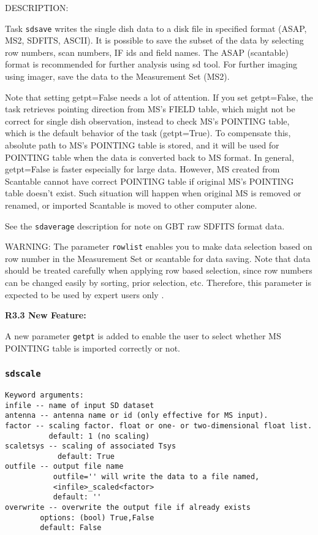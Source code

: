 DESCRIPTION:

Task {\tt sdsave} writes the single dish data to a disk file in 
specified format (ASAP, MS2, SDFITS, ASCII). It is possible to
save the subset of the data by selecting row numbers, scan numbers, IF ids
and field names. The ASAP (scantable) format is recommended for
further analysis using sd tool. For further imaging using imager,
save the data to the Measurement Set (MS2).
          
Note that setting getpt=False needs a lot of attention.
If you set getpt=False, the task retrieves pointing direction from 
MS's FIELD table, which might not be correct for single dish 
observation, instead to check MS's POINTING table, which is the 
default behavior of the task (getpt=True). To compensate this, 
absolute path to MS's POINTING table is stored, and it will be used 
for POINTING table when the data is converted back to MS format. 
In general, getpt=False is faster especially for large data. However, 
MS created from Scantable cannot have correct POINTING table if 
original MS's POINTING table doesn't exist. Such situation will 
happen when original MS is removed or renamed, or imported Scantable 
is moved to other computer alone.

See the {\tt sdaverage} description for note on GBT raw SDFITS format data.

WARNING:  The parameter {\tt rowlist} enables you to make data selection based
on row number in the Measurement Set or scantable for data saving. 
Note that data should be treated carefully when applying row
based selection, since row numbers can be changed easily by
sorting, prior selection, etc. Therefore, this parameter is expected
to be used by expert users only . 

\medskip
{\bf R3.3 New Feature:}

A new parameter {\tt getpt} is added to enable the user to select whether 
MS POINTING table is imported correctly or not.



\subsubsection{{\tt sdscale}}
\label{section:sd.sdtasks.tasks.sdscale}

\begin{verbatim}
Keyword arguments:
infile -- name of input SD dataset
antenna -- antenna name or id (only effective for MS input). 
factor -- scaling factor. float or one- or two-dimensional float list.
          default: 1 (no scaling)
scaletsys -- scaling of associated Tsys
            default: True
outfile -- output file name 
           outfile='' will write the data to a file named,
           <infile>_scaled<factor>
           default: ''
overwrite -- overwrite the output file if already exists
        options: (bool) True,False
        default: False
\end{verbatim}

